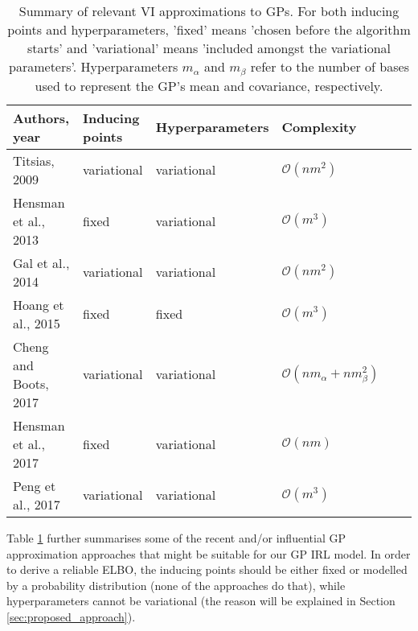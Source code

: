\documentclass{mprop}
\theoremstyle{definition}
\begin{document}
\begin{table}
  \centering
  \begin{tabular}{llllll}
    \toprule
    Authors, year & Inducing points & Hyperparameters & Complexity \\
    \midrule
    Titsias, 2009 \cite{DBLP:journals/jmlr/Titsias09} & variational & variational & $\mathcal{O}(nm^2)$ \\
    Hensman et al., 2013 \cite{DBLP:conf/uai/HensmanFL13} & fixed & variational & $\mathcal{O}(m^3)$ \\
    Gal et al., 2014 \cite{DBLP:conf/nips/GalWR14} & variational & variational & $\mathcal{O}(nm^2)$ \\
    Hoang et al., 2015 \cite{DBLP:conf/icml/HoangHL15} & fixed & fixed & $\mathcal{O}(m^3)$ \\
    Cheng and Boots, 2017 \cite{DBLP:conf/nips/ChengB17} & variational & variational & $\mathcal{O}(nm_\alpha + nm_\beta^2)$ \\
    Hensman et al., 2017 \cite{DBLP:journals/jmlr/HensmanDS17} & fixed & variational & $\mathcal{O}(nm)$ \\
    Peng et al., 2017 \cite{DBLP:conf/icml/PengZZQ17} & variational & variational & $\mathcal{O}(m^3)$ \\
    \bottomrule
  \end{tabular}
  \caption{Summary of relevant VI approximations to GPs. For both inducing
    points and hyperparameters, 'fixed' means 'chosen before the algorithm
    starts' and 'variational' means 'included amongst the variational
    parameters'. Hyperparameters $m_\alpha$ and $m_\beta$ refer to the number of
    bases used to represent the GP's mean and covariance, respectively.}
  \label{table:approximations}
\end{table}

Table \ref{table:approximations} further summarises some of the recent and/or
influential GP approximation approaches that might be suitable for our GP IRL
model. In order to derive a reliable ELBO, the inducing points should be either
fixed or modelled by a probability distribution (none of the approaches do
that), while hyperparameters cannot be variational (the reason will be explained
in Section \ref{sec:proposed_approach}).
\end{document}
